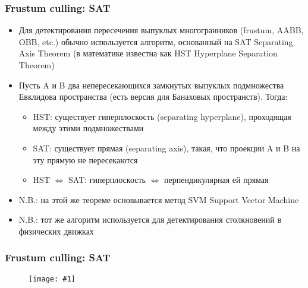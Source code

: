 \documentclass{beamer}
\newcommand{\slideimage}[1]{
  \begin{figure}
    \begin{adjustbox}{width=\textwidth, totalheight=\textheight-2\baselineskip-2\baselineskip,keepaspectratio}
      \texttt{[image: \#1]}
    \end{adjustbox}
  \end{figure}
}
\begin{document}
\begin{frame}[fragile]
\frametitle{Frustum culling: SAT}
\begin{itemize}
\item Для детектирования пересечения выпуклых многогранников (frustum, AABB, OBB, etc.) обычно используется алгоритм, основанный на SAT \textendash{} Separating Axis Theorem (в математике известна как HST \textendash{} Hyperplane Separation Theorem)
\pause
\item Пусть A и B \textendash{} два непересекающихся замкнутых выпуклых подмножества Евклидова пространства (есть версия для Банаховых пространств). Тогда:
\pause
\begin{itemize}
\item HST: существует гиперплоскость (separating hyperplane), проходящая между этими подмножествами
\pause
\item SAT: существует прямая (separating axis), такая, что проекции A и B на эту прямую не пересекаются
\pause
\item HST \begin{math}\Leftrightarrow\end{math} SAT: гиперплоскость \begin{math}\Leftrightarrow\end{math} перпендикулярная ей прямая
\end{itemize}
\pause
\item N.B.: на этой же теореме основывается метод SVM \textendash{} Support Vector Machine
\item N.B.: тот же алгоритм используется для детектирования столкновений в физических движках
\end{itemize}
\end{frame}

\begin{frame}[fragile]
\frametitle{Frustum culling: SAT}
\slideimage{sat.png}
\end{frame}
\end{document}
